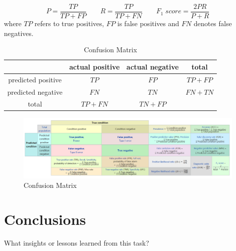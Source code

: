 \documentclass[12pt,a4paper,english]{amsart}
\begin{document}
\begin{equation}
	P = \dfrac{TP}{TP+FP} \quad\quad 
	R = \dfrac{TP}{TP+FN} \quad\quad 
	F_{1}\; score = \dfrac{2PR}{P+R}
\end{equation}
where $TP$ refers to true positives, $FP$ is false positives and $FN$ denotes false negatives.

\begin{table}
	\caption{Confusion Matrix}
	\centering
	\begin{tabular}{|c|c|c|c|}
		\hline
		& actual positive & actual negative & total \\
		\hline
		predicted positive & $TP$ & $FP$ & $TP+FP$ \\
		\hline
		predicted negative & $FN$ & $TN$ & $FN+TN$ \\
		\hline
		total	&	$TP+FN$ & $TN+FP$ & \\
		\hline
	\end{tabular}
\end{table}

\begin{figure}[htb]
	\centering
	\includegraphics[width=\textwidth]{img/auc.PNG}
	\caption{Confusion Matrix\cite{Wiki}}
\end{figure}
%
\section{Conclusions}

What insights or lessons learned from this task?
\cite{Ren2018a}



\end{document}
